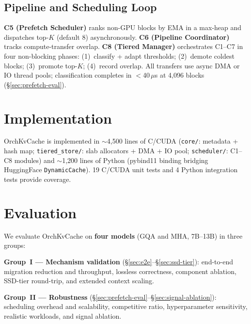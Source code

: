 \documentclass[conference]{IEEEtran}
\begin{document}
\subsection{Pipeline and Scheduling Loop}
\label{sec:pipeline}
\label{sec:sched-loop}

\textbf{C5 (Prefetch Scheduler)} ranks non-GPU blocks by EMA in a max-heap and dispatches top-$K$ (default 8) asynchronously. \textbf{C6 (Pipeline Coordinator)} tracks compute-transfer overlap. \textbf{C8 (Tiered Manager)} orchestrates C1--C7 in four non-blocking phases: (1)~classify + adapt thresholds; (2)~demote coldest blocks; (3)~promote top-$K$; (4)~record overlap. All transfers use async DMA or IO thread pools; classification completes in $<$40\,$\mu$s at 4,096 blocks (\S\ref{sec:prefetch-eval}).

\section{Implementation}

OrchKvCache is implemented in ${\sim}$4,500 lines of C/CUDA (\texttt{core/}: metadata + hash map; \texttt{tiered\_store/}: slab allocators + DMA + IO pool; \texttt{scheduler/}: C1--C8 modules) and ${\sim}$1,200 lines of Python (pybind11 binding bridging HuggingFace \texttt{DynamicCache}). 19 C/CUDA unit tests and 4 Python integration tests provide coverage.

\section{Evaluation}

We evaluate OrchKvCache on \textbf{four models} (GQA and MHA, 7B--13B) in three groups:

\noindent\textbf{Group~I --- Mechanism validation} (\S\ref{sec:e2e}--\S\ref{sec:ssd-tier}): end-to-end migration reduction and throughput, lossless correctness, component ablation, SSD-tier round-trip, and extended context scaling.

\noindent\textbf{Group~II --- Robustness} (\S\ref{sec:prefetch-eval}--\S\ref{sec:signal-ablation}): scheduling overhead and scalability, competitive ratio, hyperparameter sensitivity, realistic workloads, and signal ablation.
\end{document}
